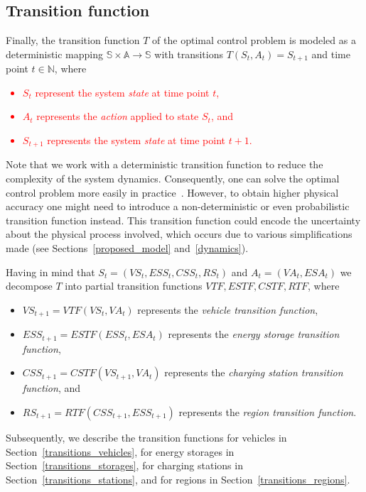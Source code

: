 \subsection{Transition function}
\label{transitions}

Finally, the transition function $T$ of the optimal control problem is modeled as a deterministic mapping $\mathbb{S} \times \mathbb{A} \rightarrow \mathbb{S}$ with transitions $T(S_t, A_t) = S_{t+1}$ and time point $t \in \mathbb{N}$, where \textcolor{red}{
\begin{itemize}
	\item $S_t$ represent the system \textit{state} at time point $t$,
	\item $A_t$ represents the \textit{action} applied to state $S_t$, and
	\item $S_{t+1}$ represents the system \textit{state} at time point $t+1$.
\end{itemize}}
Note that we work with a deterministic transition function to reduce the complexity of the system dynamics. Consequently, one can solve the optimal control problem more easily in practice~\cite{Bertsekas1995}. However, to obtain higher physical accuracy one might need to introduce a non-deterministic or even probabilistic transition function instead. This transition function could encode the uncertainty about the physical process involved, which occurs due to various simplifications made (see Sections~\ref{proposed_model} and~\ref{dynamics}).

Having in mind that $S_t = (VS_t, ESS_t, CSS_t, RS_t)$ and $A_t = (VA_t, ESA_t)$ we decompose $T$ into partial transition functions $VTF,ESTF,CSTF,RTF$, where
\begin{itemize}
	\item $VS_{t+1} = VTF(VS_t, VA_t)$ represents the \textit{vehicle transition function},
	\item $ESS_{t+1} = ESTF(ESS_t, ESA_t)$ represents the \textit{energy storage transition function},
	\item $CSS_{t+1} = CSTF(VS_{t+1}, VA_t)$ represents the \textit{charging station transition function}, and
	\item $RS_{t+1} = RTF(CSS_{t+1}, ESS_{t+1})$ represents the \textit{region transition function}.
\end{itemize}
Subsequently, we describe the transition functions for vehicles in Section~\ref{transitions_vehicles}, for energy storages in Section~\ref{transitions_storages}, for charging stations in Section~\ref{transitions_stations}, and for regions in Section~\ref{transitions_regions}.  

